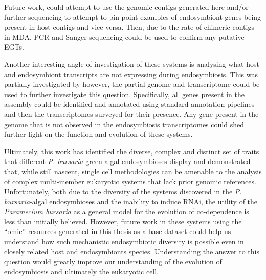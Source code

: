 Future work, could attempt to use the genomic contigs generated here
and/or further sequencing to attempt to pin-point examples of endosymbiont
genes being present in host contigs and vice versa. Then, due to the rate of 
chimeric contigs in MDA, PCR and Sanger sequencing could be used to confirm
any putative EGTs.

Another interesting angle of investigation of these systems is
analysing what host and endosymbiont transcripts are not expressing during endosymbiosis.
This was partially investigated by \citep{Kodama2014} however, 
the partial genome and transcriptome could be used to further
investigate this question.  Specifically, all genes present in the assembly
could be identified and annotated using standard annotation pipelines
and then the transcriptomes surveyed for their presence.  Any gene
present in the genome that is not observed in the endosymbiosis
transcriptomes could shed further light on the function
and evolution of these systems.


Ultimately, this work has identified the diverse, complex and distinct set
of traits that different \textit{P. bursaria}-green algal endosymbioses
display and demonstrated that, while still nascent, single cell methodologies
can be amenable to the analysis of complex multi-member eukaryotic
systems that lack prior genomic references.  Unfortunately, both due to the
diversity of the systems discovered in the \textit{P. bursaria}-algal endosymbioses
and the inability to induce RNAi, the 
utility of the \textit{Paramecium bursaria} as a general model for
the evolution of co-dependence is less than initially believed.  
However, future work in these systems using the ``omic'' resources generated in 
this thesis as a base dataset could help us understand how such mechanistic
endosymbiotic diversity is possible even in closely
related host and endosymbionts species. Understanding the answer to this
question would greatly improve our understanding of the evolution of endosymbiosis
and ultimately the eukaryotic cell.
